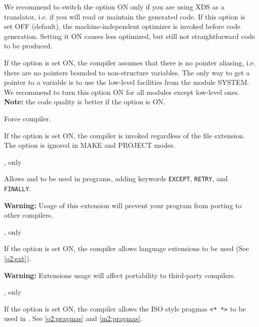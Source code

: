 \begin{description}
        We recommend to switch the option ON only if you are using XDS as a
        translator, i.e. if you will read or maintain the generated code.
\else
        If this option is set OFF (default), the machine-independent
        optimizer is invoked before code generation. Setting it ON
        causes less optimized, but still not straightforward code to
        be produced.
\fi

\ifgencode
{}
        \MLBegin{}\ModeC{}\MLEnd{} \header

        If the option is set ON, the compiler assumes that there is no
        pointer aliasing, i.e. there are no pointers bounded to
        non-structure variables. The only way to get a pointer to a
        variable is to use the low-level facilities from the module
        SYSTEM.  We recommend to turn this option ON for all modules
        except low-level ones.  {\bf Note:} the code quality is better
        if the option is ON.
\fi

        \MLBegin{}\ModeC{}\MLEnd{}

        Force \ot{} compiler.

        If the option is set ON, the \ot{} compiler is invoked
        regardless of the file extension.
        The option is ignored in MAKE and PROJECT modes.

        \MLBegin{}\ModeC{},\ot{} only\MLEnd{} \header

        Allows \mt{}  and 
        to be used in \ot{} programs, adding keywords \verb'EXCEPT', \verb'RETRY', and
        \verb'FINALLY'.

        {\bf Warning:} Usage of this extension will prevent your
        program from porting to other \ot{} compilers.

        \MLBegin{}\ModeC{},\ot{} only\MLEnd{} \header

        If the option is set ON, the compiler allows \ot{}
        language extensions to be used (See \ref{o2:ext}).

        {\bf Warning:} Extensions usage will affect
        portability to third-party \ot{} compilers.

        \MLBegin{}\ModeC{},\ot{} only\MLEnd{}

        If the option is set ON, the compiler allows the ISO \mt{}
        style pragmas \verb|<* *>| to be used in \ot{}.
        See \ref{o2:pragmas} and \ref{m2:pragmas}.


\end{description}
